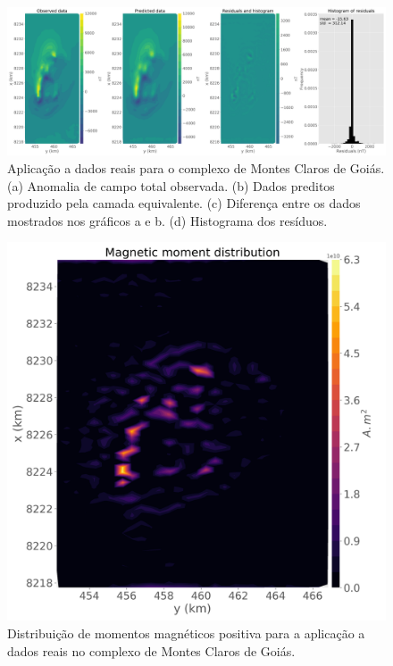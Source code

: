 \begin{figure}
	\centering
	\includegraphics[width=1.1\textwidth]{Fig/eqlayer/field_data_montes_claros/data_fitting_LM_NNLS_montesclaros.png}
	\caption{Aplicação a dados reais para o complexo de Montes Claros de Goiás. (a) Anomalia de campo total observada. (b) Dados preditos produzido pela camada equivalente. (c) Diferença entre os dados mostrados nos gráficos a e b. (d) Histograma dos resíduos.}
	\label{fig:data_fitting_real}
\end{figure}

\begin{figure}
	\centering
	\includegraphics[width=.9\textwidth]{Fig/eqlayer/field_data_montes_claros/magnetic_moment_positive_LM_NNLS_montesclaros.png}
	\caption{Distribuição de momentos magnéticos positiva para a aplicação a dados reais no complexo de Montes Claros de Goiás.}
	\label{fig:dist_momentos_pos_real}
\end{figure}

